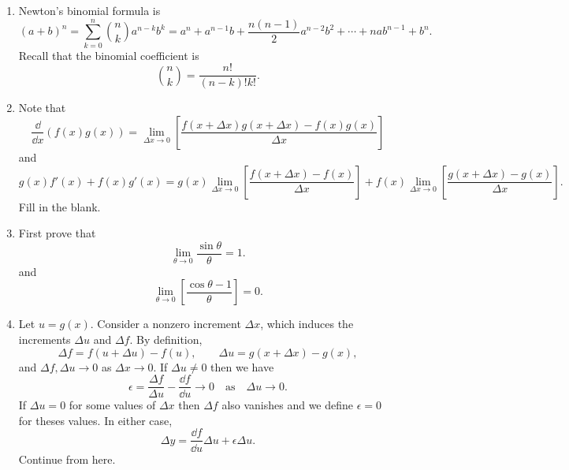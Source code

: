 \begin{Hint}
  \label{hint differentiation properties}
  \renewcommand{\theenumi}{\alph{enumi}}
  \begin{enumerate}
  \item
    Newton's binomial formula is
    \[
    (a + b)^n = \sum_{k=0}^n \binom{n}{k} a^{n-k} b^k
    = a^n + a^{n-1} b + \frac{n(n-1)}{2} a^{n-2} b^2 + \cdots + n a b^{n-1}
    + b^n.
    \]
    Recall that the binomial coefficient is
    \[
    \binom{n}{k} = \frac{n!}{(n-k)! k!}.
    \]
  \item
    Note that
    \[
    \frac{\dd}{\dd x} (f(x) g(x))
    = \lim_{\Delta x \to 0} \left[ \frac{f(x+\Delta x) g(x+\Delta x)
        - f(x) g(x)} {\Delta x} \right] 
    \]
    and
    \[
    g(x) f'(x) + f(x) g'(x)
    = g(x) \lim_{\Delta x \to 0} \left[ \frac{f(x+\Delta x) - f(x)}
      {\Delta x} \right] +
    f(x) \lim_{\Delta x \to 0} \left[ \frac{g(x+\Delta x)- g(x)}
      {\Delta x} \right].
    \]
    Fill in the blank.
  \item
    First prove that
    \[
    \lim_{\theta \to 0} \frac{\sin \theta}{\theta} = 1.
    \]
    and
    \[
    \lim_{\theta \to 0} \left[ \frac{\cos \theta - 1}{\theta} \right] = 0.
    \]
  \item
    Let $u = g(x)$.
    Consider a nonzero increment $\Delta x$, which induces the increments
    $\Delta u$ and $\Delta f$.  By definition,
    \[
    \Delta f = f(u + \Delta u) - f(u), \qquad
    \Delta u = g(x + \Delta x) - g(x),
    \]
    and $\Delta f, \Delta u \to 0$ as $\Delta x \to 0$.
    If $\Delta u \neq 0$ then we have
    \[
    \epsilon = \frac{\Delta f}{\Delta u} - \frac{\dd f}{\dd u} \to 0 \quad \mathrm{as}
    \quad \Delta u \to 0.
    \]
    If $\Delta u = 0$ for some values of $\Delta x$ then $\Delta f$ also vanishes
    and we define $\epsilon = 0$ for theses values.  In either case,
    \[
    \Delta y = \frac{\dd f}{\dd u} \Delta u + \epsilon \Delta u.
    \]
    Continue from here.
  \end{enumerate}
  \renewcommand{\theenumi}{\arabic{enumi}}
\end{Hint}





\begin{Hint}
  \label{hint differentiable f = x|x|}
\end{Hint}



